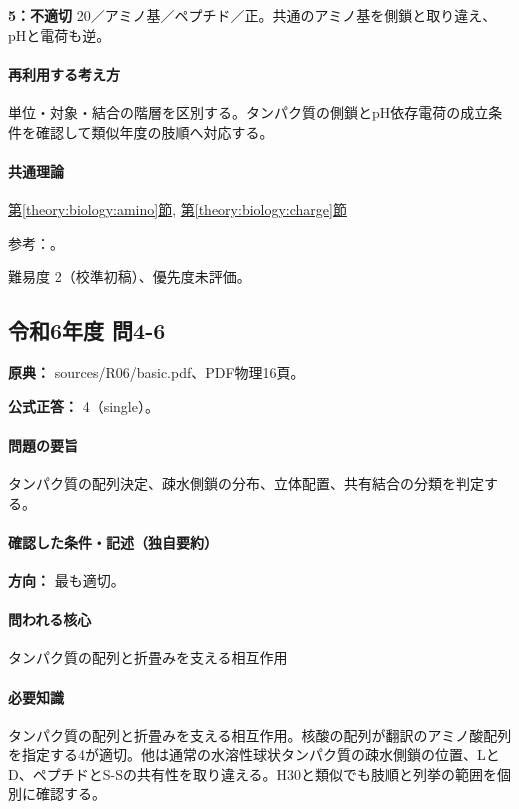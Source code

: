 \noindent\textbf{5：不適切} 20／アミノ基／ペプチド／正。共通のアミノ基を側鎖と取り違え、pHと電荷も逆。\par

\paragraph{再利用する考え方} 単位・対象・結合の階層を区別する。タンパク質の側鎖とpH依存電荷の成立条件を確認して類似年度の肢順へ対応する。

\paragraph{共通理論} \hyperref[theory:biology:amino]{第\ref*{theory:biology:amino}節}, \hyperref[theory:biology:charge]{第\ref*{theory:biology:charge}節}

\par 参考：\cite{mit_protein}。

\par 難易度 2（校準初稿）、優先度未評価。

\subsection{令和6年度 問4-6}
\label{q:r06-reg-basic-4-6}

\noindent\textbf{原典：} sources/R06/basic.pdf、PDF物理16頁。

\textbf{公式正答：} 4（single）。

\paragraph{問題の要旨} タンパク質の配列決定、疎水側鎖の分布、立体配置、共有結合の分類を判定する。

\paragraph{確認した条件・記述（独自要約）}\mbox{}\par

\noindent\textbf{方向：} 最も適切。\par

\paragraph{問われる核心} タンパク質の配列と折畳みを支える相互作用

\paragraph{必要知識} タンパク質の配列と折畳みを支える相互作用。核酸の配列が翻訳のアミノ酸配列を指定する4が適切。他は通常の水溶性球状タンパク質の疎水側鎖の位置、LとD、ペプチドとS-Sの共有性を取り違える。H30と類似でも肢順と列挙の範囲を個別に確認する。

